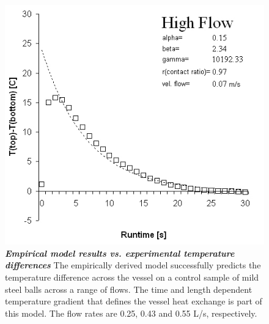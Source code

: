 \begin{figure}[!h]
\begin{center}
\includegraphics[scale=.5]{steelhighFlow.jpg}
\caption[Empirical Model and Data Comparison - High]{\textbf{\emph{Empirical model results vs. experimental temperature differences}} The empirically derived model successfully predicts the temperature difference across the vessel on a control sample of mild steel balls across a range of flows. The time and length dependent temperature gradient that defines the vessel heat exchange is part of this model. The flow rates are 0.25, 0.43 and 0.55 L/s, respectively.\label{steelHigh}}
\end{center}
\end{figure}
\pagebreak

